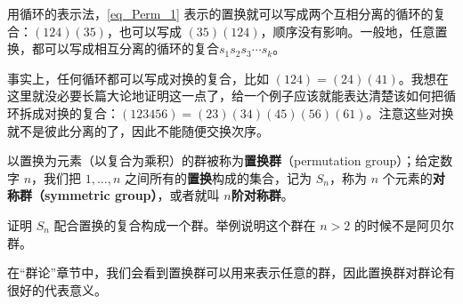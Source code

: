 用循环的表示法，\autoref{eq_Perm_1}  表示的置换就可以写成两个互相分离的循环的复合：$(1 2 4)(3 5)$，也可以写成 $(3 5 )(1 2 4)$，顺序没有影响。一般地，任意置换，都可以写成相互分离的循环的复合$s_1s_2s_3\cdots s_k$。

事实上，任何循环都可以写成对换的复合，比如 $(1 2 4) = (2 4)(4 1)$。我想在这里就没必要长篇大论地证明这一点了，给一个例子应该就能表达清楚该如何把循环拆成对换的复合：$(1 2 3 4 5 6) = (2 3)(3 4)(4 5)(5 6)(6 1)$。注意这些对换就不是彼此分离的了，因此不能随便交换次序。

以置换为元素（以复合为乘积）的群被称为\textbf{置换群}（permutation group）；给定数字 $n$，我们把 $1, \dots, n$ 之间所有的\textbf{置换}构成的集合，记为 $S_n$，称为 $n$ 个元素的\textbf{对称群（symmetric group）}，或者就叫 $n$\textbf{阶对称群}。

\begin{exercise}{}
证明 $S_n$ 配合置换的复合构成一个群。举例说明这个群在 $n>2$ 的时候不是阿贝尔群。
\end{exercise}

在“群论”章节中，我们会看到置换群可以用来表示任意的群，因此置换群对群论有很好的代表意义。




